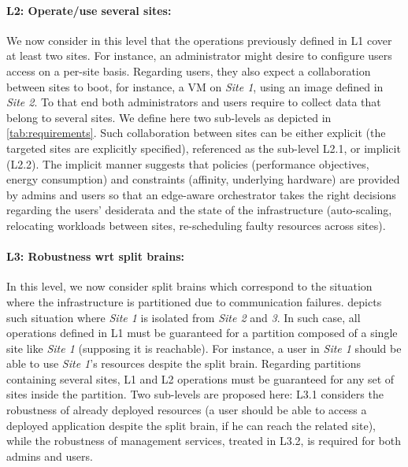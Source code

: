 \paragraph{L2: Operate/use several sites:}
We now consider in this level that the operations previously defined in L1
cover at least two sites. For instance, an administrator might desire to
configure users access on a per-site basis. Regarding users, they also expect
a collaboration between sites to boot, for instance, a VM on \emph{Site 1},
using an image defined in \emph{Site 2}. To that end both administrators and
users require to collect data that belong to several sites. We define here two
sub-levels as depicted in \cref{tab:requirements}. Such collaboration between
sites can be either explicit (\ie the targeted sites are explicitly specified),
referenced as the sub-level L2.1, or implicit (L2.2). The implicit manner
suggests that policies (\eg performance objectives, energy consumption) and
constraints (\eg affinity, underlying hardware) are provided by admins and users so
that an edge-aware orchestrator takes the right decisions regarding the users'
desiderata and the state of the infrastructure (\eg auto-scaling, relocating
workloads between sites, re-scheduling faulty resources across sites).

\paragraph{L3: Robustness wrt split brains:}
In this level, we now consider split brains which correspond to the situation
where the infrastructure is partitioned due to communication failures.
 depicts such situation where \emph{Site 1} is isolated from
\emph{Site 2} and \emph{3}. In such case, all operations defined in L1 must be
guaranteed for a partition composed of a single site like \emph{Site 1}
(supposing it is reachable). For instance, a user in \emph{Site 1} should be
able to use \emph{Site 1}'s resources despite the split brain. Regarding
partitions containing several sites, L1 and L2 operations must be guaranteed
for any set of sites inside the partition.
Two sub-levels are proposed here: L3.1 considers the robustness of already
deployed resources (\eg a user should be able to access a deployed application
despite the split brain, if he can reach the related site), while the
robustness of management services, treated in L3.2, is required for both admins
and users.

